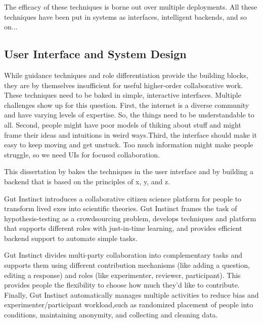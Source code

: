 The efficacy of these techniques is borne out over multiple deployments. All these techniques have been put in systems as interfaces, intelligent backends, and so on... \\


\subsection{User Interface and System Design}

While guidance techniques and role differentiation provide the building blocks, they are by themselves insufficient for useful higher-order collaborative work. These techniques need to be baked in simple, interactive interfaces. Multiple challenges show up for this question. First, the internet is a diverse community and have varying levels of expertise. So, the things need to be understandable to all. Second, people might have poor models of thiking about stuff and might frame their ideas and intuitions in weird ways.Third, the interface should make it easy to keep moving and get unstuck.  Too much information might make people struggle, so we need UIs for focused collaboration. 

This dissertation by bakes the techniques in the user interface  and by building a backend that is based on the principles of x, y, and z.

Gut Instinct  introduces a collaborative citizen science platform for people to transform lived exes into scientific theories. Gut Instinct frames the task of hypothesis-testing as a crowdsourcing problem, develops techniques and platform that supports different roles with just-in-time learning, and provides efficient backend support to automate simple tasks.

Gut Instinct divides multi-party collaboration into complementary tasks and supports them using different contribution mechanisms (like adding a question, editing a response) and roles (like experimenter, reviewer, participant). This provides people the flexibility to choose how much they’d like to contribute. Finally, Gut Instinct automatically manages multiple activities to reduce 
bias and experimenter/participant workload,such as randomized placement of 
people into conditions, maintaining anonymity, and collecting and cleaning data.


